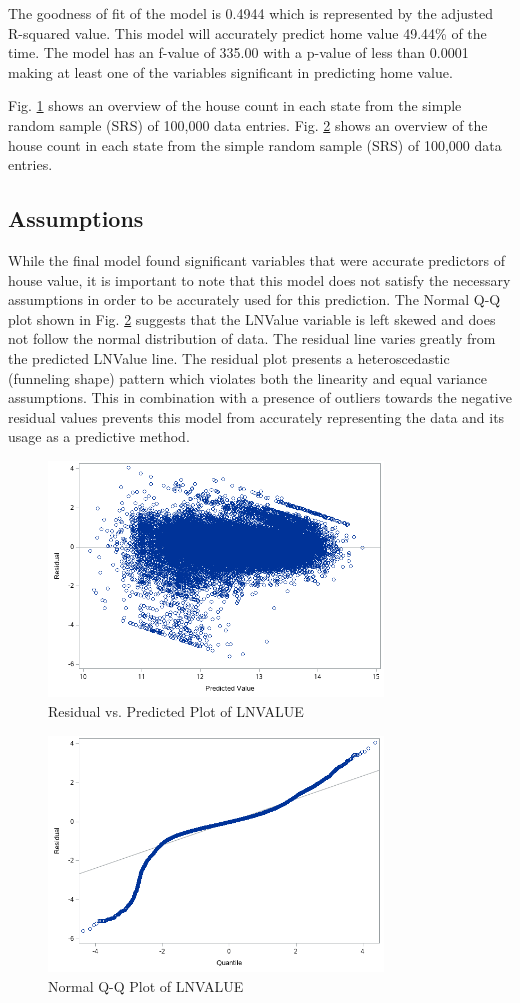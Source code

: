 \indent The goodness of fit of the model is 0.4944 which is represented by the adjusted R-squared value. This model will accurately predict home value 49.44\% of the time. The model has an f-value of 335.00 with a p-value of less than 0.0001 making at least one of the variables significant in predicting home value.

Fig. \ref{figure:residual_plot} shows an overview of the house count in each state from the simple random sample (SRS) of 100,000 data entries.
Fig. \ref{figure:qq_plot} shows an overview of the house count in each state from the simple random sample (SRS) of 100,000 data entries.

\subsection{Assumptions}
While the final model found significant variables that were accurate predictors of house value, it is important to note that this model does not satisfy the necessary assumptions in order to be accurately used for this prediction. The Normal Q-Q plot shown in Fig. \ref{figure:qq_plot} suggests that the LNValue variable is left skewed and does not follow the normal distribution of data. The residual line varies greatly from the predicted LNValue line. The residual plot presents a heteroscedastic (funneling shape) pattern which violates both the linearity and equal variance assumptions. This in combination with a presence of outliers towards the negative residual values prevents this model from accurately representing the data and its usage as a predictive method.

\begin{figure}[h!]
	\centering
	\includegraphics[width=3.5in]{./fig/ResidualPlot.PNG}
	\caption{Residual vs. Predicted Plot of LNVALUE}
	\label{figure:residual_plot}
\end{figure}

\begin{figure}[h!]
	\centering
	\includegraphics[width=3.5in]{./fig/QQPlot.PNG}
	\caption{Normal Q-Q Plot of LNVALUE}
	\label{figure:qq_plot}
\end{figure}
